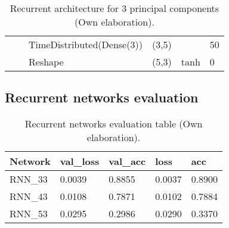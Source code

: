 \begin{table}[H]
\begin{center}
\begin{tabular}{ll|l|l|l|l|}
\multicolumn{1}{|l|}{}                                                                 &                                   & TimeDistributed(Dense(3))          & (3,5)                                &                                          & 50                                           \\ \cline{3-6} 
\multicolumn{1}{|l|}{}                                                                 &                                   & Reshape                            & (5,3)                                & tanh                                     & 0                                           \\ \hline
\end{tabular}

\end{center}
\caption{Recurrent architecture for 3 principal components (Own elaboration).}
\label{table:rnn_3}
\end{table}

\subsection{Recurrent networks evaluation}

\begin{table}[H]
\centering
\begin{tabular}{|l|l|l|l|l|}
\hline
\textbf{Network} & \textbf{val\_loss} & \textbf{val\_acc} & \textbf{loss} & \textbf{acc} \\ \hline
RNN\_33 & 0.0039 & 0.8855 & 0.0037 & 0.8900 \\ \hline
RNN\_43 & 0.0108 & 0.7871 & 0.0102 & 0.7884 \\ \hline
RNN\_53 & 0.0295 & 0.2986 & 0.0290 & 0.3370 \\ \hline
\end{tabular}
\caption{Recurrent networks evaluation table (Own elaboration).}
\label{table:evaluacion_rnn}
\end{table}